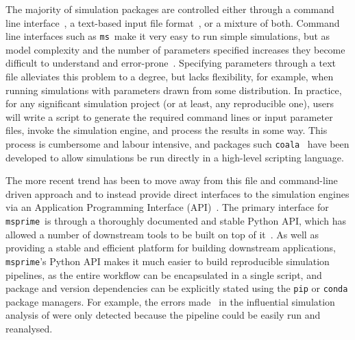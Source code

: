 \documentclass{article}
\newcommand{\msprime}[0]{\texttt{msprime}}
\newcommand{\ms}[0]{\texttt{ms}}
\begin{document}
The majority of simulation packages are controlled either through
a command line interface~\citep[e.g.][]{hudson2002generating,kern2016discoal},
a text-based input file
format~\citep[e.g.][]{guillaume2006nemo,excoffier2011fastsimcoal,shlyakhter2014cosi2},
or a mixture of both.
Command line interfaces such as \ms\ make it very easy to run simple
simulations, but as model complexity and the number of parameters specified increases
they become difficult to understand and
error-prone~\citep{ragsdale2020lessons,gower2021demes}.
Specifying parameters through a text file alleviates this problem to a degree,
but lacks flexibility, for example, when running simulations with parameters
drawn from some distribution. In practice, for any significant simulation
project (or at least, any reproducible one), users will write a script
to generate the required command lines or input parameter files,
invoke the simulation engine, and process the results in some way.
This process is cumbersome and labour intensive, and packages
such \texttt{coala}~\citep{staab2016coala} have been developed
to allow simulations be run directly in a high-level
scripting language.

The more recent trend has been to move away from this file and command-line
driven approach and to instead provide direct interfaces to the simulation
engines via an Application Programming Interface (API)~\citep[e.g.][]{
thornton2014cpp,kelleher2016efficient,becheler2019quetzal,haller2019slim}.
The primary interface for \msprime\ is through a thoroughly documented and
stable Python
API, which has allowed a number of downstream tools to be built on top of
it~\citep{terhorst2017robust,chan2018likelihood,spence2019inference,
adrion2020community,adrion2020predicting, kamm2020efficiently,
mckenzie2020ipcoal, montinaro2020revisiting,
de2021geonomics,rivera2021simulation}.
As well as providing a stable and efficient platform for building
downstream applications, \msprime's Python API makes it much easier to
build reproducible simulation pipelines, as the entire workflow can
be encapsulated in a single script, and package and version
dependencies can be explicitly stated using the \texttt{pip}
or \texttt{conda} package managers.
For example, the errors made~\citep{ragsdale2020lessons,martin2020erratum}
in the influential simulation analysis of
\cite{martin2017human} were only detected because the pipeline
could be easily run and reanalysed.
\end{document}
